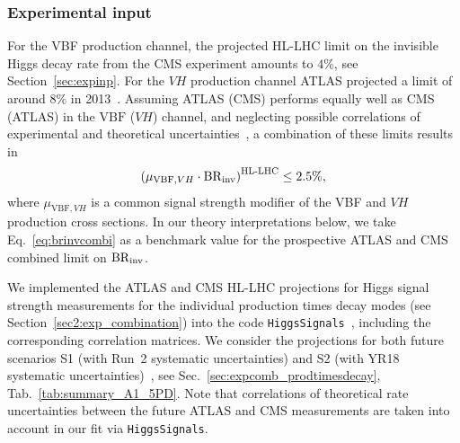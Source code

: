 \documentclass[../report.tex]{subfiles}
\begin{document}
\subsubsection{Experimental input}
\label{sec6:exp}
{For the VBF production channel, the projected HL-LHC limit on the invisible Higgs decay rate from the CMS experiment amounts to $4\%$, see Section~\ref{sec:expinp}. For the $VH$ production channel ATLAS projected a limit of around $8\%$ in 2013}~\cite{ATL-PHYS-PUB-2013-014}.
Assuming ATLAS (CMS) performs equally well as CMS (ATLAS) in the $\text{VBF}$ ($VH$) channel, and neglecting possible correlations of experimental and theoretical uncertainties~\cite{CMS-PAS-JME-15-001}, a combination of these limits results in
\begin{align}\label{eq:brinvcombi}
\left(\mu_{\text{VBF},VH} \cdot \BRHinv \right)^\text{HL-LHC} \le 2.5\%,
\end{align}
where $\mu_{\text{VBF},VH}$ is a common signal strength modifier of the VBF and $VH$ production cross sections. In our theory interpretations below, we take Eq.~\eqref{eq:brinvcombi} as a benchmark value for the prospective ATLAS and CMS combined limit on $\mathrm{BR}_\mathrm{inv}$.


We implemented the ATLAS and CMS HL-LHC projections for Higgs signal strength measurements for the individual production times decay modes (see Section~\ref{sec2:exp_combination}) into the code \texttt{Higgs\-Signals}~\cite{Bechtle:2013xfa,Bechtle:2014ewa}, including the corresponding correlation matrices.
We consider the projections for both future scenarios S1 (with Run~2 systematic uncertainties) and S2 (with YR18 systematic uncertainties)~\cite{HLHELHCCommonSystematics}, see Sec.~\ref{sec:expcomb_prodtimesdecay}, Tab.~\ref{tab:summary_A1_5PD}.
Note that correlations of theoretical rate uncertainties between the future ATLAS and CMS measurements are taken into account in our fit via \texttt{HiggsSignals}. 
\end{document}
